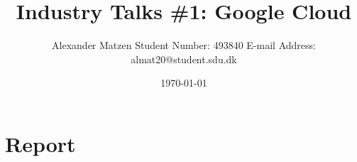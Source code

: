\documentclass[11pt]{article}
\begin{document}
\setlength\parindent{0pt}
\setlength{\parskip}{.25em}
\pagestyle{empty}

\title{Industry Talks \#1: Google Cloud}
\author{Alexander Matzen \addvspace{1em} Student Number: 493840 \newline E-mail Address: almat20@student.sdu.dk}
\date{\today}


\pagecolor{white}

\section*{Report}






\end{document}

